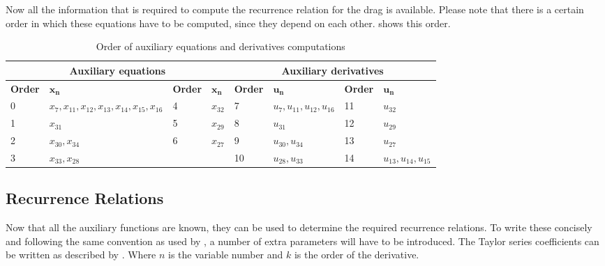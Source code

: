 \noindent
Now all the information that is required to compute the recurrence relation for the drag is available. Please note that there is a certain order in which these equations have to be computed, since they depend on each other.  shows this order.


\begin{table}[H]
\begin{center}
\caption{Order of auxiliary equations and derivatives computations}
\label{tab:calcOrderAuxEq}
\begin{tabular}{|l|l||l|l||l|l||l|l|}
\hline 
\multicolumn{4}{c}{\textbf{Auxiliary equations}} & \multicolumn{4}{c}{\textbf{Auxiliary derivatives}} \\ \hline \hline
\textbf{Order} & $\mathbf{x_{n}}$ &\textbf{Order} & $\mathbf{x_{n}}$ & \textbf{Order} & $\mathbf{u_{n}}$ & \textbf{Order} & $\mathbf{u_{n}}$ \\ \hline 
0 & $ x_{7} ,x_{11}, x_{12}, x_{13}, x_{14}, x_{15}, x_{16} $ & 4 & $ x_{32}$ & 7 & $ u_{7}, u_{11}, u_{12}, u_{16} $ & 11 & $ u_{32} $  \\ \hline
1 & $ x_{31} $ & 5 & $ x_{29} $  & 8 & $u_{31}$ &  12 &  $ u_{29} $ \\ \hline
2 & $ x_{30}, x_{34}$ & 6 & $ x_{27} $  & 9 & $ u_{30}, u_{34} $ &  13 & $ u_{27} $ \\ \hline
3 & $ x_{33}, x_{28} $ &   &  & 10 & $ u_{28}, u_{33} $ &  14 &  $ u_{13}, u_{14}, u_{15} $\\ \hline


\end{tabular}
\end{center}
\end{table}





%
%



\subsection{Recurrence Relations}
\label{subsec:recRel}
Now that all the auxiliary functions are known, they can be used to determine the required recurrence relations. To write these concisely and following the same convention as used by \cite{scott2008high}, a number of extra parameters will have to be introduced. The Taylor series coefficients can be written as described by . Where $n$ is the variable number and $k$ is the order of the derivative.


